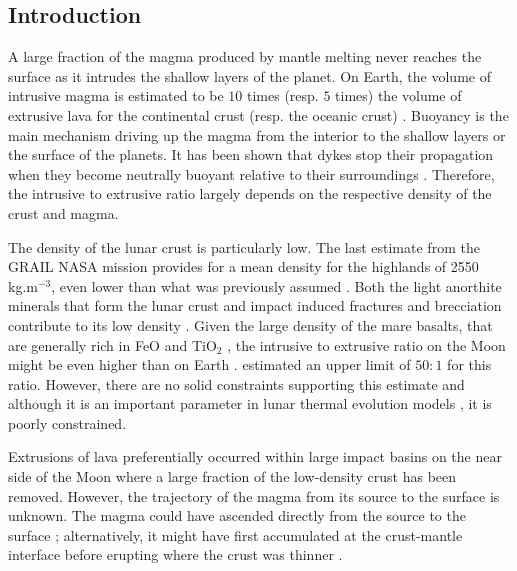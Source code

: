 \begin{article}

%
%


  \section{Introduction}
  \label{Introduction}

  A  large fraction  of the  magma  produced by  mantle melting  never
  reaches  the  surface as  it  intrudes  the  shallow layers  of  the
  planet. On Earth,  the volume of intrusive magma is  estimated to be
  $10$ times  (resp. $5$ times) the  volume of extrusive lava  for the
  continental      crust      (resp.      the      oceanic      crust)
  \citep{Crisp1984}.  Buoyancy is  the main  mechanism driving  up the
  magma from the interior to the  shallow layers or the surface of the
  planets. It  has been shown  that dykes stop their  propagation when
  they  become  neutrally  buoyant   relative  to  their  surroundings
  \citep{Walker1989,Rivalta2005,Taisne2009a}. Therefore, the intrusive
  to extrusive ratio largely depends  on the respective density of the
  crust and magma.
	
  The  density  of the  lunar  crust  is  particularly low.  The  last
  estimate from the GRAIL NASA mission provides for a mean density for
  the  highlands  of  2550  kg.m$^{-3}$,  even  lower  than  what  was
  previously assumed  \citep{Wieczorek2012}. Both the  light anorthite
  minerals that form the lunar  crust and impact induced fractures and
  brecciation      contribute       to      its       low      density
  \citep{Wilhelms1987a}. Given the large  density of the mare basalts,
  that are generally rich  in FeO and TiO$_{2}$ \citep{Wieczorek2001},
  the intrusive  to extrusive ratio on  the Moon might be  even higher
  than                             on                            Earth
  \citep{El-Baz1970,Wilson1981,Hiesinger2006,Glotch2010}. \citet{Head1992a}
  estimated an  upper limit of  $50:1$ for this ratio.  However, there
  are no solid constraints supporting this estimate and although it is
  an   important  parameter   in   lunar   thermal  evolution   models
  \citep{Laneuville2013}, it is poorly constrained.
	
  Extrusions  of  lava  preferentially occurred  within  large  impact
  basins on the  near side of the  Moon where a large  fraction of the
  low-density crust has  been removed. However, the  trajectory of the
  magma from  its source to  the surface  is unknown. The  magma could
  have   ascended   directly   from   the  source   to   the   surface
  \citep{Wieczorek2001};   alternatively,   it    might   have   first
  accumulated at the crust-mantle  interface before erupting where the
  crust was thinner \citep{Wilson1981}.
	

\end{article}
